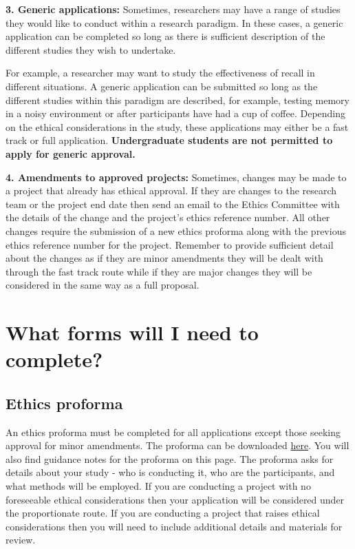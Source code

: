 \documentclass[
  12pt,
]{book}
\begin{document}
\textbf{3. Generic applications:} Sometimes, researchers may have a range of studies they would like to conduct within a research paradigm. In these cases, a generic application can be completed so long as there is sufficient description of the different studies they wish to undertake.

For example, a researcher may want to study the effectiveness of recall in different situations. A generic application can be submitted so long as the different studies within this paradigm are described, for example, testing memory in a noisy environment or after participants have had a cup of coffee. Depending on the ethical considerations in the study, these applications may either be a fast track or full application. \textbf{Undergraduate students are not permitted to apply for generic approval.}

\textbf{4. Amendments to approved projects:} Sometimes, changes may be made to a project that already has ethical approval. If they are changes to the research team or the project end date then send an email to the Ethics Committee with the details of the change and the project's ethics reference number. All other changes require the submission of a new ethics proforma along with the previous ethics reference number for the project. Remember to provide sufficient detail about the changes as if they are minor amendments they will be dealt with through the fast track route while if they are major changes they will be considered in the same way as a full proposal.

\section{What forms will I need to complete?}\label{what-forms-will-i-need-to-complete}

\subsection{Ethics proforma}\label{ethics-proforma}

An ethics proforma must be completed for all applications except those seeking approval for minor amendments. The proforma can be downloaded \href{https://inside.psych.cf.ac.uk/}{here}. You will also find guidance notes for the proforma on this page. The proforma asks for details about your study - who is conducting it, who are the participants, and what methods will be employed. If you are conducting a project with no foreseeable ethical considerations then your application will be considered under the proportionate route. If you are conducting a project that raises ethical considerations then you will need to include additional details and materials for review.
\end{document}
